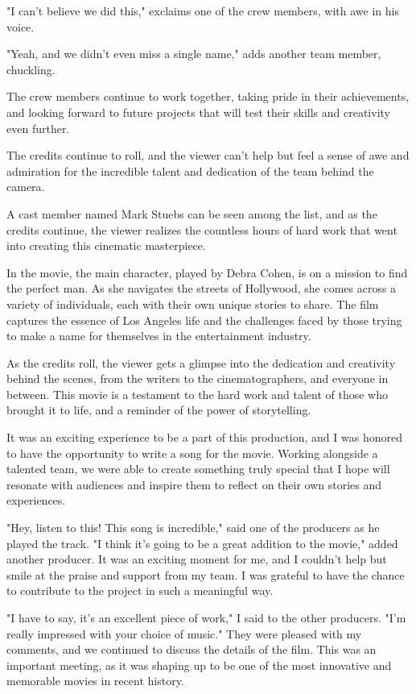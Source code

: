 \documentclass[smalldemyvopaper,11pt,twoside,onecolumn,openright,extrafontsizes]{memoir}
\begin{document}
"I can't believe we did this," exclaims one of the crew members, with awe in his voice.\par
"Yeah, and we didn't even miss a single name," adds another team member, chuckling.\par
The crew members continue to work together, taking pride in their achievements, and looking forward to future projects that will test their skills and creativity even further.\par
The credits continue to roll, and the viewer can't help but feel a sense of awe and admiration for the incredible talent and dedication of the team behind the camera.\par
A cast member named Mark Stuebs can be seen among the list, and as the credits continue, the viewer realizes the countless hours of hard work that went into creating this cinematic masterpiece.\par
In the movie, the main character, played by Debra Cohen, is on a mission to find the perfect man. As she navigates the streets of Hollywood, she comes across a variety of individuals, each with their own unique stories to share. The film captures the essence of Los Angeles life and the challenges faced by those trying to make a name for themselves in the entertainment industry.\par
As the credits roll, the viewer gets a glimpse into the dedication and creativity behind the scenes, from the writers to the cinematographers, and everyone in between. This movie is a testament to the hard work and talent of those who brought it to life, and a reminder of the power of storytelling.\par
It was an exciting experience to be a part of this production, and I was honored to have the opportunity to write a song for the movie. Working alongside a talented team, we were able to create something truly special that I hope will resonate with audiences and inspire them to reflect on their own stories and experiences.\par
"Hey, listen to this! This song is incredible," said one of the producers as he played the track. "I think it's going to be a great addition to the movie," added another producer. It was an exciting moment for me, and I couldn't help but smile at the praise and support from my team. I was grateful to have the chance to contribute to the project in such a meaningful way.\par
"I have to say, it's an excellent piece of work," I said to the other producers. "I'm really impressed with your choice of music." They were pleased with my comments, and we continued to discuss the details of the film. This was an important meeting, as it was shaping up to be one of the most innovative and memorable movies in recent history.\par
\end{document}
